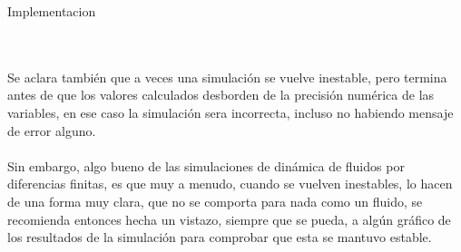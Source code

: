 \begin{section}{Implementacion}
\begin{itemize}
~\\
~\\
Se aclara también que a veces una simulación se vuelve inestable, pero termina antes de que los valores calculados desborden de la precisión numérica de las variables, en ese caso la simulación sera incorrecta, incluso no habiendo mensaje de error alguno. 
~\\
~\\
Sin embargo, algo bueno de las simulaciones de dinámica de fluidos por diferencias finitas, es que muy a menudo, cuando se vuelven inestables, lo hacen de una forma muy clara, que no se comporta para nada como un fluido, se recomienda entonces hecha un vistazo, siempre que se pueda, a algún gráfico de los resultados de la simulación para comprobar que esta se mantuvo estable.
\end{itemize}

\end{section}


